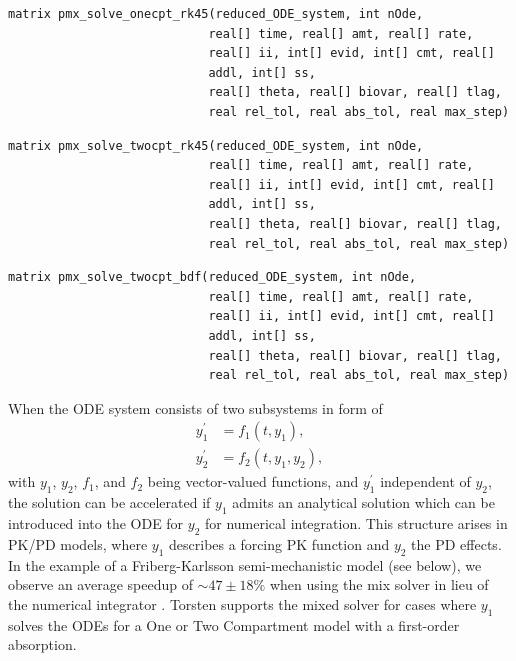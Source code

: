 \documentclass[11pt, reqno, oneside]{amsbook}
\numberwithin{equation}{chapter}
\numberwithin{figure}{chapter}
\numberwithin{table}{chapter}
\theoremstyle{remark}
\begin{document}
\begin{verbatim}
matrix pmx_solve_onecpt_rk45(reduced_ODE_system, int nOde,
                            real[] time, real[] amt, real[] rate,
                            real[] ii, int[] evid, int[] cmt, real[]
                            addl, int[] ss,
                            real[] theta, real[] biovar, real[] tlag,
                            real rel_tol, real abs_tol, real max_step)
\end{verbatim}
\begin{verbatim}
matrix pmx_solve_twocpt_rk45(reduced_ODE_system, int nOde,
                            real[] time, real[] amt, real[] rate,
                            real[] ii, int[] evid, int[] cmt, real[]
                            addl, int[] ss,
                            real[] theta, real[] biovar, real[] tlag,
                            real rel_tol, real abs_tol, real max_step)
\end{verbatim}
\begin{verbatim}
matrix pmx_solve_twocpt_bdf(reduced_ODE_system, int nOde,
                            real[] time, real[] amt, real[] rate,
                            real[] ii, int[] evid, int[] cmt, real[]
                            addl, int[] ss,
                            real[] theta, real[] biovar, real[] tlag,
                            real rel_tol, real abs_tol, real max_step)
\end{verbatim}
When the ODE system consists of two subsystems in form of
\begin{align*}
  y_1^\prime &= f_1(t, y_1), \\
  y_2^\prime &= f_2(t, y_1, y_2),
\end{align*}
with \(y_1\), \(y_2\), \(f_1\), and \(f_2\) being vector-valued functions, and
\(y_1^\prime\) independent of \(y_2\), the solution can be
accelerated if \(y_1\) admits an analytical solution which can
be introduced into the ODE for \(y_2\) for numerical
integration. This structure arises in PK/PD
models, where \(y_1\) describes a forcing PK function and \(y_2\) the PD
effects. In the example of a Friberg-Karlsson
semi-mechanistic model \cite{friberg_mechanistic_2003} (see below), we observe an average speedup of
\(\sim 47 \pm 18 \%\) when using the mix solver in lieu of the numerical
integrator \cite{margossian_mixed_2017}. Torsten supports the mixed solver for
cases where \(y_1\) solves the ODEs for a One or Two Compartment model
with a first-order absorption.
\end{document}

